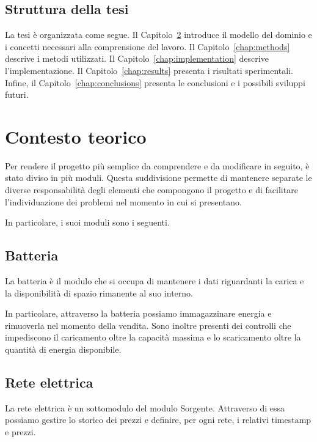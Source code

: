 \documentclass[12pt,a4paper,oneside]{report}
\begin{document}
\section{Struttura della tesi}

La tesi è organizzata come segue.
Il Capitolo~\ref{chap:background} introduce il modello del dominio e i
concetti necessari alla comprensione del lavoro.
Il Capitolo~\ref{chap:methods} descrive i metodi utilizzati.
Il Capitolo~\ref{chap:implementation} descrive l'implementazione.
Il Capitolo~\ref{chap:results} presenta i risultati sperimentali.
Infine, il Capitolo~\ref{chap:conclusions} presenta le conclusioni
e i possibili sviluppi futuri.


\chapter{Contesto teorico}
\label{chap:background}

Per rendere il progetto più semplice da comprendere e da modificare in seguito, 
è stato diviso in più moduli. Questa suddivisione permette di mantenere separate 
le diverse responsabilità degli elementi che compongono il progetto e di facilitare 
l'individuazione dei problemi nel momento in cui si presentano.

In particolare, i suoi moduli sono i seguenti.

\section{Batteria}

La batteria è il modulo che si occupa di mantenere i dati riguardanti la carica 
e la disponibilità di spazio rimanente al suo interno.

In particolare, attraverso la batteria possiamo immagazzinare energia e rimuoverla 
nel momento della vendita. Sono inoltre presenti dei controlli che impediscono 
il caricamento oltre la capacità massima e lo scaricamento oltre la quantità 
di energia disponibile.

\section{Rete elettrica}

La rete elettrica è un sottomodulo del modulo Sorgente. Attraverso di essa possiamo 
gestire lo storico dei prezzi e definire, per ogni rete, i relativi timestamp 
e prezzi.
\end{document}
